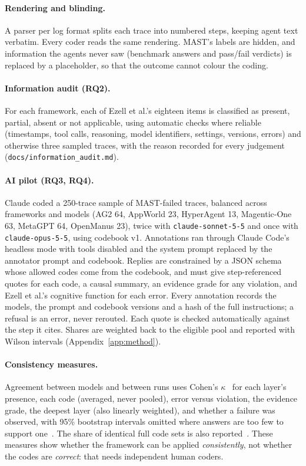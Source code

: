 \documentclass[10pt,a4paper]{article}
\newcommand{\code}[1]{\texttt{#1}}
\begin{document}
\paragraph{Rendering and blinding.} A parser per log format splits each trace into
numbered steps, keeping agent text verbatim. Every coder reads the same rendering.
MAST's labels are hidden, and information the agents never saw (benchmark answers
and pass/fail verdicts) is replaced by a placeholder, so that the outcome cannot
colour the coding.

\paragraph{Information audit (RQ2).} For each framework, each of Ezell et al.'s
eighteen items is classified as present, partial, absent or not applicable, using
automatic checks where reliable (timestamps, tool calls, reasoning, model
identifiers, settings, versions, errors) and otherwise three sampled traces, with
the reason recorded for every judgement (\code{docs/information\_audit.md}).

\paragraph{AI pilot (RQ3, RQ4).} Claude coded a 250-trace sample of MAST-failed
traces, balanced across frameworks and models (AG2 64, AppWorld 23, HyperAgent 13,
Magentic-One 63, MetaGPT 64, OpenManus 23), twice with \code{claude-sonnet-5-5}
and once with \code{claude-opus-5-5}, using codebook v1. Annotations ran through
Claude Code's headless mode with tools disabled and the system prompt replaced by
the annotator prompt and codebook. Replies are constrained by a JSON schema whose
allowed codes come from the codebook, and must give step-referenced quotes for
each code, a causal summary, an evidence grade for any violation, and Ezell et
al.'s cognitive function for each error. Every annotation records the models, the
prompt and codebook versions and a hash of the full instructions; a refusal is an
error, never rerouted. Each quote is checked automatically against the step it
cites. Shares are weighted back to the eligible pool and reported with Wilson
intervals (Appendix~\ref{app:method}).

\paragraph{Consistency measures.} Agreement between models and between runs uses
Cohen's $\kappa$~\cite{cohen1960kappa,landis1977measurement} for each layer's
presence, each code (averaged, never pooled), error versus violation, the evidence
grade, the deepest layer (also linearly weighted), and whether a failure was
observed, with 95\% bootstrap intervals omitted where answers are too few to
support one~\cite{feinstein1990paradox}. The share of identical full code sets is
also reported~\cite{ahmadi2025hfacsgrpo}. These measures show whether the
framework can be applied \emph{consistently}, not whether the codes are
\emph{correct}: that needs independent human coders.
\end{document}
